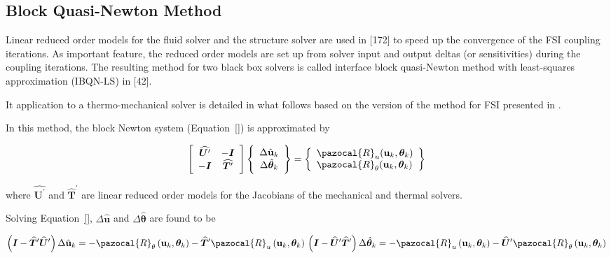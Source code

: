 \subsection{Block Quasi-Newton Method}

Linear reduced order models for the fluid solver and the structure solver are used in [172] to speed up the convergence of the FSI coupling iterations. As important feature, the reduced order models are set up from solver input and output deltas (or sensitivities) during the coupling iterations. The resulting method for two black box solvers is called interface block quasi-Newton method with least-squares approximation (IBQN-LS) in [42].

It application to a thermo-mechanical solver is detailed in what follows based on the version of the method for FSI presented in \cite{gatzhammer}.

In this method, the block Newton system (Equation~\eqref{}) is approximated by

$$
\left[\begin{array}{cc}
\widehat{\boldsymbol{U}^{\prime}} & -\boldsymbol{I} \\
-\boldsymbol{I} & \widehat{\boldsymbol{T}^{\prime}}
\end{array}\right]\left\{\begin{array}{c}
\Delta \hat{\mathbf{u}}_k \\
\Delta \hat{\boldsymbol{\theta}}_k
\end{array}\right\}=\left\{\begin{array}{l}
\pazocal{R}_{u}(\mathbf{u}_k, \boldsymbol{\theta}_k) \\
\pazocal{R}_{\theta}(\mathbf{u}_k, \boldsymbol{\theta}_k)
\end{array}\right\}
$$

where $\widehat{\boldsymbol{U}^{\prime}}$ and $\widehat{\boldsymbol{T}}^{\prime}$ are linear reduced order models for the Jacobians of the mechanical and thermal solvers.

Solving Equation~\eqref{}, $\Delta\hat{\mathbf u}$ and $\Delta \hat{\boldsymbol \theta}$  are found to be

$$
\left(\boldsymbol{I}-\widehat{\boldsymbol{T}}^{\prime} \widehat{\boldsymbol{U}}^{\prime}\right) \Delta \hat{\mathbf{u}}_k=-\pazocal{R}_{\theta}\left(\mathbf{u}_k, \boldsymbol{\theta}_k\right)-\widehat{\boldsymbol{T}}^{\prime} \pazocal{R}_{u}\left(\mathbf{u}_k, \boldsymbol{\theta}_k\right)\\
\left(\boldsymbol{I}-\widehat{\boldsymbol{U}}^{\prime} \widehat{\boldsymbol{T}}^{\prime}\right) \Delta \hat{\boldsymbol{\theta}}_k=-\pazocal{R}_{u}\left(\mathbf{u}_k, \boldsymbol{\theta}_k\right)-\widehat{\boldsymbol{U}}^{\prime} \pazocal{R}_{\theta}\left(\mathbf{u}_k, \boldsymbol{\theta}_k\right)
$$

